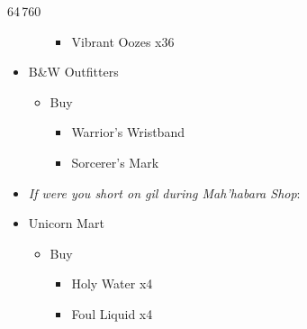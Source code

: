 \begin{shop}{64\,760}
\begin{multicols}{2}
\begin{itemize}
\begin{itemize}
\begin{itemize}
            \item Vibrant Oozes x36
        \end{itemize}
    \end{itemize}
    \item B\&W Outfitters
    \begin{itemize}
        \item Buy
        \begin{itemize}
            \item Warrior's Wristband
            \item Sorcerer's Mark
        \end{itemize}
    \end{itemize}
    \item \textit{If were you short on gil during Mah'habara Shop}:
    \item Unicorn Mart
    \begin{itemize}
        \item Buy
        \begin{itemize}
            \item Holy Water x4
            \item Foul Liquid x4
        \end{itemize}
    \end{itemize}
\end{itemize}
\end{multicols}
\end{shop}
